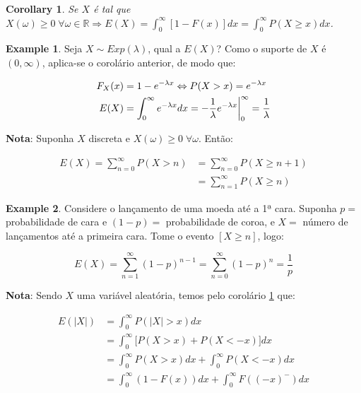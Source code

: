 \documentclass[
]{article}
\newtheorem{corollary}{Corollary}[section]
\theoremstyle{definition}
\theoremstyle{definition}
\newtheorem{example}{Example}[section]
\theoremstyle{definition}
\theoremstyle{definition}
\theoremstyle{remark}
\begin{document}
\begin{corollary}
\protect\hypertarget{cor:esppositiva}{}\label{cor:esppositiva}Se \(X\) é tal que \(X(\omega) \ge 0 \; \forall \omega \in \mathbb{R} \Rightarrow E(X) = \int_{0}^{\infty}[1 - F(x)]dx = \int_{0}^{\infty}P(X \ge x)dx\).
\end{corollary}

\begin{example}
Seja \(X \sim Exp(\lambda)\), qual a \(E(X)\)? Como o suporte de \(X\) é \((0,\infty)\), aplica-se o corolário anterior, de modo que:

\begin{align*}
F_{X}(x) &= 1 - e^{-\lambda x} \Leftrightarrow P(X > x) = e^{-\lambda x} \\
E(X) &= \int_{0}^{\infty}e^{-\lambda x}dx = -\frac{1}{\lambda}e^{-\lambda x}\bigg{|}_{0}^{\infty} = \frac{1}{\lambda}
\end{align*}
\end{example}

\textbf{Nota}: Suponha \(X\) discreta e \(X(\omega) \ge 0 \; \forall \omega\). Então:

\begin{align*}
E(X) = \sum_{n=0}^{\infty}P(X > n) &= \sum_{n=0}^{\infty}P(X \ge n+1) \\
&= \sum_{n=1}^{\infty}P(X \ge n)
\end{align*}

\begin{example}
Considere o lançamento de uma moeda até a 1ª cara. Suponha \(p=\) probabilidade de cara e \((1 - p) =\) probabilidade de coroa, e \(X =\) número de lançamentos até a primeira cara. Tome o evento \([X \ge n]\), logo:

\begin{equation*}
E(X) = \sum_{n=1}^{\infty}(1 - p)^{n-1} = \sum_{n=0}^{\infty}(1 - p)^{n} = \frac{1}{p}
\end{equation*}
\end{example}

\textbf{Nota}: Sendo \(X\) uma variável aleatória, temos pelo corolário \ref{cor:esppositiva} que:

\begin{align*}
E(|X|) &= \int_{0}^{\infty}P(|X| > x)dx \\
&= \int_{0}^{\infty}\big[P(X > x) + P(X < -x)\big]dx \\
&= \int_{0}^{\infty}P(X > x)dx + \int_{0}^{\infty}P(X < -x)dx \\
&= \int_{0}^{\infty}(1-F(x))dx + \int_{0}^{\infty}F((-x)^{-})dx
\end{align*}
\end{document}
